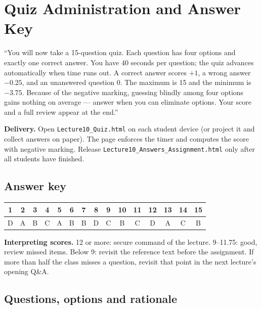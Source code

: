 \documentclass[11pt]{article}
\begin{document}
\section{Quiz Administration and Answer Key}

\begin{sayit}``You will now take a 15-question quiz. Each question has four options and exactly one correct answer. You have 40 seconds per question; the quiz advances automatically when time runs out. A correct answer scores $+1$, a wrong answer $-0.25$, and an unanswered question 0. The maximum is 15 and the minimum is $-3.75$. Because of the negative marking, guessing blindly among four options gains nothing on average --- answer when you can eliminate options. Your score and a full review appear at the end.''\end{sayit}

\textbf{Delivery.} Open \texttt{Lecture10\_Quiz.html} on each student device (or project it and collect answers on paper). The page enforces the timer and computes the score with negative marking. Release \texttt{Lecture10\_Answers\_Assignment.html} only after all students have finished.

\subsection*{Answer key}\begin{center}\small\renewcommand{\arraystretch}{1.3}\begin{tabular}{|c|c|c|c|c|c|c|c|c|c|c|c|c|c|c|}\hline \textbf{1} & \textbf{2} & \textbf{3} & \textbf{4} & \textbf{5} & \textbf{6} & \textbf{7} & \textbf{8} & \textbf{9} & \textbf{10} & \textbf{11} & \textbf{12} & \textbf{13} & \textbf{14} & \textbf{15}\\\hline D & A & B & C & A & B & B & D & C & B & C & D & A & C & B\\\hline\end{tabular}\end{center}

\textbf{Interpreting scores.} 12 or more: secure command of the lecture. 9--11.75: good, review missed items. Below 9: revisit the reference text before the assignment. If more than half the class misses a question, revisit that point in the next lecture's opening Q\&A.

\subsection*{Questions, options and rationale}
\end{document}
